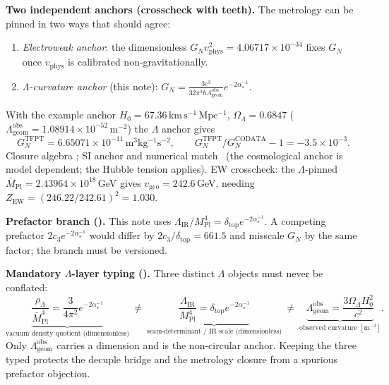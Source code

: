 \documentclass[11pt,a4paper]{article}
\newcommand{\TFPT}{\mathrm{TFPT}}
\newcommand{\MPl}{M_{\mathrm{Pl}}}
\newcommand{\Mbar}{\bar M_{\mathrm{Pl}}}
\newcommand{\GN}{G_N}
\newcommand{\cthree}{c_3}
\newcommand{\dtop}{\delta_{\mathrm{top}}}
\newcommand{\ainv}{\alpha^{-1}_\star}
\newcommand{\LamIR}{\Lambda_{\mathrm{IR}}}
\newcommand{\Lamgeom}{\Lambda_{\mathrm{geom}}}
\theoremstyle{definition}
\begin{document}
\noindent\textbf{Two independent anchors (crosscheck with teeth).} The metrology can be pinned in
two ways that should agree:
\begin{enumerate}
\item \emph{Electroweak anchor}: the dimensionless $\GN v_{\mathrm{phys}}^2=4.06717\times10^{-34}$
fixes $\GN$ once $v_{\mathrm{phys}}$ is calibrated non-gravitationally.
\item \emph{$\Lambda$-curvature anchor} (this note): $\GN=\tfrac{3c^3}{32\pi^3\hbar\Lamgeom^{\mathrm{obs}}}e^{-2\ainv}$.
\end{enumerate}
With the example anchor $H_0=67.36\,\mathrm{km\,s^{-1}\,Mpc^{-1}}$, $\Omega_\Lambda=0.6847$
($\Lamgeom^{\mathrm{obs}}=1.08914\times10^{-52}\,\mathrm{m^{-2}}$) the $\Lambda$ anchor gives
\begin{equation}
  \GN^{\TFPT}=6.65071\times10^{-11}\,\mathrm{m^3kg^{-1}s^{-2}},\qquad
  \GN^{\TFPT}/\GN^{\mathrm{CODATA}}-1=-3.5\times10^{-3}.
\end{equation}
Closure algebra \mE; SI anchor and numerical match \mC\ (the cosmological anchor is model dependent;
the Hubble tension applies). EW crosscheck: the $\Lambda$-pinned $\Mbar=2.43964\times10^{18}\,$GeV
gives $v_{\mathrm{geo}}=242.6\,$GeV, needing $Z_{\mathrm{EW}}=(246.22/242.61)^2=1.030$.

\par\smallskip\noindent\textbf{Prefactor branch (\mO).}
This note uses $\LamIR/\MPl^4=\dtop e^{-2\ainv}$. A competing prefactor $2\cthree e^{-2\ainv}$ would
differ by $2\cthree/\dtop=661.5$ and misscale $\GN$ by the same factor; the branch must be versioned.
\par\smallskip

\par\smallskip\noindent\textbf{Mandatory $\Lambda$-layer typing (\mO).}
Three distinct $\Lambda$ objects must never be conflated:
\[
  \underbrace{\frac{\rho_\Lambda}{\Mbar^4}=\frac{3}{4\pi^2}e^{-2\ainv}}_{\text{vacuum density quotient (dimensionless)}}
  \ \neq\
  \underbrace{\frac{\LamIR}{\MPl^4}=\dtop e^{-2\ainv}}_{\text{seam-determinant / IR scale (dimensionless)}}
  \ \neq\
  \underbrace{\Lamgeom^{\mathrm{obs}}=\frac{3\Omega_\Lambda H_0^2}{c^2}}_{\text{observed curvature }[\mathrm{m}^{-2}]} .
\]
Only $\Lamgeom^{\mathrm{obs}}$ carries a dimension and is the non-circular anchor. Keeping the three
typed protects the decuple bridge and the metrology closure from a spurious prefactor objection.
\par\smallskip
\end{document}
